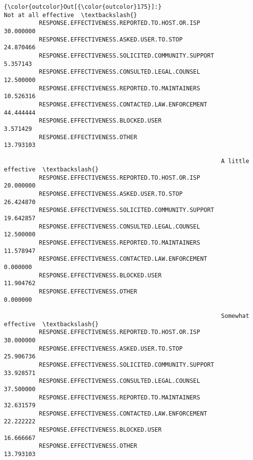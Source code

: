 \documentclass[11pt]{article}
\begin{document}
            \begin{Verbatim}[commandchars=\\\{\}]
{\color{outcolor}Out[{\color{outcolor}175}]:}                                                     Not at all effective  \textbackslash{}
          RESPONSE.EFFECTIVENESS.REPORTED.TO.HOST.OR.ISP                 30.000000   
          RESPONSE.EFFECTIVENESS.ASKED.USER.TO.STOP                      24.870466   
          RESPONSE.EFFECTIVENESS.SOLICITED.COMMUNITY.SUPPORT              5.357143   
          RESPONSE.EFFECTIVENESS.CONSULTED.LEGAL.COUNSEL                 12.500000   
          RESPONSE.EFFECTIVENESS.REPORTED.TO.MAINTAINERS                 10.526316   
          RESPONSE.EFFECTIVENESS.CONTACTED.LAW.ENFORCEMENT               44.444444   
          RESPONSE.EFFECTIVENESS.BLOCKED.USER                             3.571429   
          RESPONSE.EFFECTIVENESS.OTHER                                   13.793103   
          
                                                              A little effective  \textbackslash{}
          RESPONSE.EFFECTIVENESS.REPORTED.TO.HOST.OR.ISP               20.000000   
          RESPONSE.EFFECTIVENESS.ASKED.USER.TO.STOP                    26.424870   
          RESPONSE.EFFECTIVENESS.SOLICITED.COMMUNITY.SUPPORT           19.642857   
          RESPONSE.EFFECTIVENESS.CONSULTED.LEGAL.COUNSEL               12.500000   
          RESPONSE.EFFECTIVENESS.REPORTED.TO.MAINTAINERS               11.578947   
          RESPONSE.EFFECTIVENESS.CONTACTED.LAW.ENFORCEMENT              0.000000   
          RESPONSE.EFFECTIVENESS.BLOCKED.USER                          11.904762   
          RESPONSE.EFFECTIVENESS.OTHER                                  0.000000   
          
                                                              Somewhat effective  \textbackslash{}
          RESPONSE.EFFECTIVENESS.REPORTED.TO.HOST.OR.ISP               30.000000   
          RESPONSE.EFFECTIVENESS.ASKED.USER.TO.STOP                    25.906736   
          RESPONSE.EFFECTIVENESS.SOLICITED.COMMUNITY.SUPPORT           33.928571   
          RESPONSE.EFFECTIVENESS.CONSULTED.LEGAL.COUNSEL               37.500000   
          RESPONSE.EFFECTIVENESS.REPORTED.TO.MAINTAINERS               32.631579   
          RESPONSE.EFFECTIVENESS.CONTACTED.LAW.ENFORCEMENT             22.222222   
          RESPONSE.EFFECTIVENESS.BLOCKED.USER                          16.666667   
          RESPONSE.EFFECTIVENESS.OTHER                                 13.793103   
          

\end{Verbatim}
\end{document}
